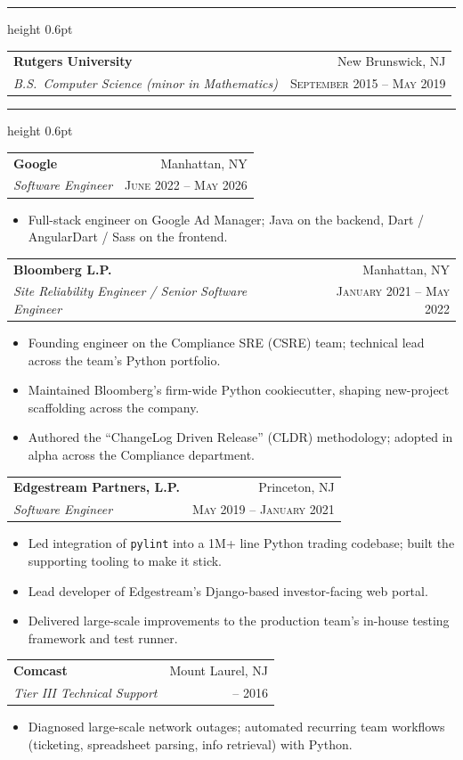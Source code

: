 \documentclass[letterpaper,11pt]{article}
\makeatletter
\newcommand{\resheading}[1]{%
  \par\addvspace{14pt}%
  \noindent
  {\sffamily\bfseries\color{batgold}\fontsize{11pt}{13pt}\selectfont%
   \textls*[150]{\MakeUppercase{#1}}}%
  \hspace{0.6em}%
  {\color{batgold}\leaders\hrule height 0.6pt\hfill\kern0pt}%
  \par\nobreak\addvspace{4pt}%
}
\newcommand{\ressubheading}[4]{%
  \par\addvspace{4pt}%
  \noindent
  \begin{tabular*}{\textwidth}{@{}l@{\extracolsep{\fill}}r@{}}
    {\sffamily\bfseries\color{batblack}\fontsize{11pt}{13pt}\selectfont #1} &
    {\sffamily\color{batstone}\fontsize{10pt}{12pt}\selectfont #2} \\[1pt]
    {\itshape\color{batink}\fontsize{11pt}{13pt}\selectfont #3} &
    {\sffamily\scshape\color{batstone}\fontsize{9.5pt}{11.5pt}\selectfont #4}
  \end{tabular*}\par\vspace{-2pt}
}
\makeatother
\begin{document}
\resheading{Training}
\ressubheading{Rutgers University}{New Brunswick, NJ}{B.S.\ Computer Science (minor in Mathematics)}{September 2015 -- May 2019}

\resheading{Casework}

\ressubheading{Google}{Manhattan, NY}{Software Engineer}{June 2022 -- May 2026}
\begin{itemize}
  \item Full-stack engineer on Google Ad Manager; Java on the backend, Dart / AngularDart / Sass on the frontend.
\end{itemize}

\ressubheading{Bloomberg L.P.}{Manhattan, NY}{Site Reliability Engineer / Senior Software Engineer}{January 2021 -- May 2022}
\begin{itemize}
  \item Founding engineer on the Compliance SRE (CSRE) team; technical lead across the team's Python portfolio.
  \item Maintained Bloomberg's firm-wide Python cookiecutter, shaping new-project scaffolding across the company.
  \item Authored the ``ChangeLog Driven Release'' (CLDR) methodology; adopted in alpha across the Compliance department.
\end{itemize}

\ressubheading{Edgestream Partners, L.P.}{Princeton, NJ}{Software Engineer}{May 2019 -- January 2021}
\begin{itemize}
  \item Led integration of \texttt{pylint} into a 1M+ line Python trading codebase; built the supporting tooling to make it stick.
  \item Lead developer of Edgestream's Django-based investor-facing web portal.
  \item Delivered large-scale improvements to the production team's in-house testing framework and test runner.
\end{itemize}

\ressubheading{Comcast}{Mount Laurel, NJ}{Tier III Technical Support}{2011 -- 2016}
\begin{itemize}
  \item Diagnosed large-scale network outages; automated recurring team workflows (ticketing, spreadsheet parsing, info retrieval) with Python.
\end{itemize}
\end{document}
